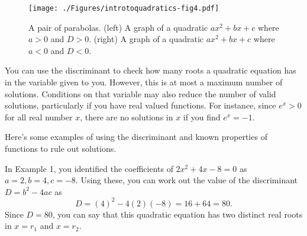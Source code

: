 \documentclass[
  12pt,
  a4paper, oneside]{starmastarticle}
\begin{document}
\begin{figure}

{\centering \texttt{[image: ./Figures/introtoquadratics-fig4.pdf]}

}

\caption{\label{fig-4}A pair of parabolas. (left) A graph of a quadratic
\(ax^2 + bx + c\) where \(a > 0\) and \(D > 0\). (right) A graph of a
quadratic \(ax^2 + bx + c\) where \(a < 0\) and \(D < 0\).}

\end{figure}

\begin{tcolorbox}[enhanced jigsaw, bottomrule=.15mm, toprule=.15mm, coltitle=black, rightrule=.15mm, breakable, titlerule=0mm, arc=.35mm, toptitle=1mm, colback=white, opacitybacktitle=0.6, title=\textcolor{quarto-callout-warning-color}{\faExclamationTriangle}\hspace{0.5em}{Warning}, left=2mm, bottomtitle=1mm, opacityback=0, colbacktitle=quarto-callout-warning-color!10!white, colframe=quarto-callout-warning-color-frame, leftrule=.75mm]
You can use the discriminant to check how many roots a quadratic
equation has in the variable given to you. However, this is at most a
maximum number of solutions. Conditions on that variable may also reduce
the number of valid solutions, particularly if you have real valued
functions. For instance, since \(e^x > 0\) for all real number \(x\),
there are no solutions in \(x\) if you find \(e^x = -1\).
\end{tcolorbox}

Here's some examples of using the discriminant and known properties of
functions to rule out solutions.

\begin{tcolorbox}[enhanced jigsaw, bottomrule=.15mm, colback=white, opacityback=0, rightrule=.15mm, breakable, left=2mm, arc=.35mm, toprule=.15mm, colframe=quarto-callout-note-color-frame, leftrule=.75mm]
\begin{minipage}[t]{5.5mm}
\textcolor{quarto-callout-note-color}{\faInfo}
\end{minipage}%
\begin{minipage}[t]{\textwidth - 5.5mm}
In Example 1, you identified the coefficients of \(2x^2 + 4x - 8 = 0\)
as \(a = 2, b = 4, c = -8\). Using these, you can work out the value of
the discriminant \(D = b^2 - 4ac\) as
\[D = (4)^2 - 4(2)(-8) = 16 + 64 = 80.\] Since \(D = 80\), you can say
that this quadratic equation has two distinct real roots in \(x = r_1\)
and \(x = r_2\).\end{minipage}%
\end{tcolorbox}
\end{document}
